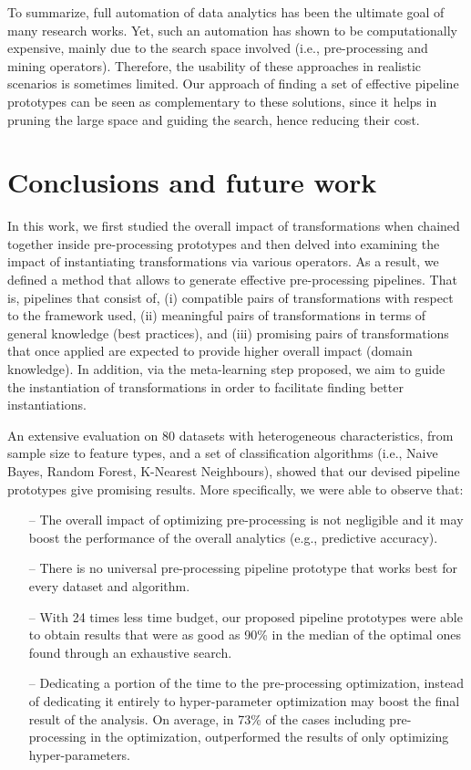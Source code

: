 To summarize, full automation of data analytics has been the ultimate goal of many research works. Yet, such an automation has shown to be computationally expensive, mainly due to the search space involved (i.e., pre-processing and mining operators). Therefore, the usability of these approaches in realistic scenarios is sometimes limited. Our approach of finding a set of effective pipeline prototypes can be seen as complementary to these solutions, since it helps in pruning the large space and guiding the search, hence reducing their cost.

\section{Conclusions and future work}
\label{sec:conclusions}

In this work, we first studied the overall impact of transformations when chained together inside pre-processing prototypes and then delved into examining the impact of instantiating transformations via various operators. As a result, we defined a method that allows to generate effective pre-processing pipelines. That is, pipelines that consist of, (i) compatible pairs of transformations with respect to the framework used,  (ii) meaningful pairs of transformations in terms of general knowledge (best practices), and (iii) promising pairs of transformations that once applied are expected to provide higher overall impact (domain knowledge). 
In addition, via the meta-learning step proposed, we aim to guide the instantiation of transformations in order to facilitate finding better instantiations.

An extensive evaluation on 80 datasets with heterogeneous characteristics, from sample size to feature types, and a set of classification algorithms (i.e., Naive Bayes, Random Forest, K-Nearest Neighbours), showed that our devised pipeline prototypes give promising results. More specifically, we were able to observe that:
\begin{itemize}
    \item [--] The overall impact of optimizing pre-processing is not negligible and it may boost the performance of the overall analytics (e.g., predictive accuracy).
    \item [--] There is no universal pre-processing pipeline prototype that works best for every dataset and algorithm.
    \item [--] With 24 times less time budget, our proposed pipeline prototypes were able to obtain results that were as good as 90\% in the median of the optimal ones found through an exhaustive search.
    \item [--] Dedicating a portion of the time to the pre-processing optimization, instead of dedicating it entirely to hyper-parameter optimization may boost %
    the final result of the analysis. On average, in 73\% of the cases including pre-processing in the optimization, outperformed the results of only optimizing hyper-parameters.
\end{itemize}

